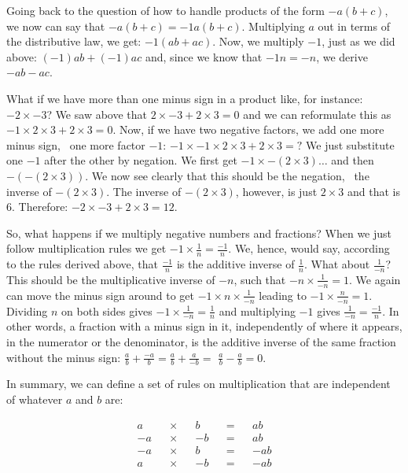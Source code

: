 \documentclass[tikz]{scrreprt}
\begin{document}
Going back to the question of how to handle products of the form
$-a(b + c)$, we now can say that $-a(b + c) = -1a(b+c)$.
Multiplying $a$ out in terms of the distributive law,
we get: $-1(ab + ac)$. Now, we multiply $-1$, just as we did above:
$(-1)ab + (-1)ac$ and, since we know that $-1n = -n$,
we derive $-ab - ac$.

What if we have more than one minus sign in a product
like, for instance:  $-2 \times -3$?
We saw above that
$2 \times -3 + 2 \times 3 = 0$
and we can reformulate this as
$-1 \times 2 \times 3 + 2 \times 3 = 0$.
Now, if we have two negative factors,
we add one more minus sign, \ie\ one more factor $-1$:
$-1 \times -1 \times 2 \times 3 + 2 \times 3 = ?$
We just substitute one $-1$ after the other
by negation. We first get
$-1 \times -(2 \times 3)\dots$ and then 
$-(-(2\times 3))$.
We now see clearly that this should be the negation,
\ie\ the inverse of $-(2 \times 3)$.
The inverse of $-(2 \times 3)$, however, is just
$2 \times 3$ and that is 6.
Therefore: $-2 \times -3 + 2 \times 3 = 12$.

So, what happens if we multiply negative numbers
and fractions? 
When we just follow multiplication rules
we get $-1 \times \frac{1}{n} = \frac{-1}{n}$.
We, hence, would say, according to the rules
derived above, that $\frac{-1}{n}$ is the 
additive inverse of $\frac{1}{n}$. 
What about $\frac{1}{-n}$?
This should be the multiplicative inverse of $-n$,
such that $-n \times \frac{1}{-n} = 1$.
We again can move the minus sign around
to get $-1 \times n \times \frac{1}{-n}$ 
leading to $-1 \times \frac{n}{-n} = 1$.
Dividing $n$ on both sides gives 
$-1 \times \frac{1}{-n} = \frac{1}{n}$ and
multiplying $-1$ gives $\frac{1}{-n} = \frac{-1}{n}$.
In other words,
a fraction with a minus sign in it,
independently of where it appears,
in the numerator or the denominator,
is the additive inverse of the same fraction
without the minus sign:
$\frac{a}{b} + \frac{-a}{b} = \frac{a}{b} + \frac{a}{-b} =$
$\frac{a}{b} - \frac{a}{b} = 0$.

In summary, we can define a set of rules
on multiplication that are independent of whatever
$a$ and $b$ are:

\begin{align*}
 a && \times &&  b && = && ab\\
-a && \times && -b && = && ab\\
-a && \times &&  b && = && -ab\\
 a && \times && -b && = && -ab
\end{align*}
\end{document}
